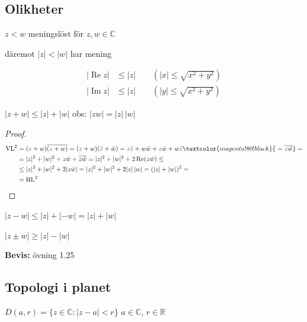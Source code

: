 \subsection{Olikheter}

\begin{note}
\textcolor{red!70!black}{$z < w$ meningslöst för $z, w \in \mathbb{C}$}

\textcolor{blue!60!black}{däremot $|z| < |w|$ har mening}
\end{note}

\begin{note}
\begin{align*}
  |\operatorname{Re} z| &\le |z| \qquad (|x| \le \sqrt{x^2 + y^2}) \\
  |\operatorname{Im} z| &\le |z| \qquad (|y| \le \sqrt{x^2 + y^2})
\end{align*}
\end{note}

\begin{theorem}
$|z + w| \le |z| + |w|$ \hfill \textcolor{magenta!80!black}{obs: $|zw| = |z|\,|w|$}
\end{theorem}
\begin{proof}
\begin{align*}
  \text{VL}^2 &= (z+w)\overline{(z+w)} = (z+w)(\bar{z} + \bar{w}) = z\bar{z} + w\bar{w} + z\bar{w} + w\bar{z}\textcolor{magenta!80!black}{\ = \overline{z\bar{w}}} = \\
  &= |z|^2 + |w|^2 + z\bar{w} + \overline{z\bar{w}} = |z|^2 + |w|^2 + 2\operatorname{Re}(z\bar{w}) \le \\
  &\le |z|^2 + |w|^2 + 2|z\bar{w}| = |z|^2 + |w|^2 + 2|z|\,|w| = (|z| + |w|)^2 = \\
  &= \text{HL}^2
\end{align*}
\end{proof}

\begin{note}
$|z - w| \le |z| + |-w| = |z| + |w|$
\end{note}

\begin{theorem}
$|z \pm w| \ge |z| - |w|$
\end{theorem}
\textcolor{red!70!black}{\textbf{Bevis:}} övning 1.25

\subsection{Topologi i planet}
$D(a, r) = \{z \in \mathbb{C} : |z - a| < r\}$ \quad $a \in \mathbb{C}$, $r \in \mathbb{R}$

